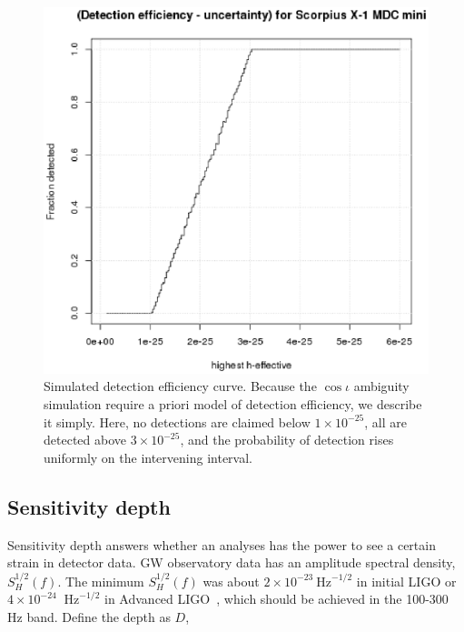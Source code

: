 \documentclass[12pt]{iopart}
\begin{document}
\begin{figure}
\begin{center}
\includegraphics[trim=0 10 10 5, clip, width=0.70\paperwidth,height=0.48\paperheight]{plots/PlotHeffDistH0DetectionEfficiency200breaks.eps}
\caption{ Simulated detection efficiency curve. Because the $\cos \iota$ ambiguity simulation require a priori model of detection efficiency, we describe it simply. Here, no detections are claimed below $1\times 10^{-25}$, all are detected above $3\times 10^{-25}$, and the probability of detection rises uniformly on the intervening interval.
\label{fig:plotheffdisth0detectionefficiency200breaks}}
\end{center}
\end{figure}

\subsection{Sensitivity depth}
\label{sensitivity-depth-appendix}

Sensitivity depth answers whether an analyses has the power to see a certain strain in detector data.
GW observatory data has an amplitude spectral density, $S_H^{1/2}(f)$.
The minimum $S_H^{1/2}(f)$ was about $2\times 10^{-23}\mathrm{~Hz}^{-1/2}$ in initial LIGO or $4\times 10^{-24}$ $\mathrm{~Hz}^{-1/2}$ in Advanced LIGO~\cite{HarryALIGO2010}, which should be achieved in the 100-300 Hz band.
Define the depth as $D$,
\end{document}
